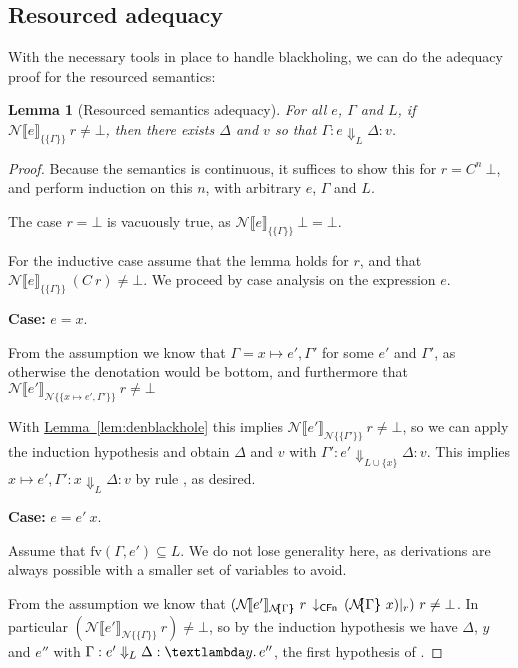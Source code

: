 \documentclass{jfp1}
\newcommand{\myref}[2]{\hyperref[#2]{#1~\ref*{#2}}}
\newtheorem{lemma}{Lemma}
\theoremstyle{nonumberbreak}
\newtheorem{proof}{Proof}
\newcommand{\sCFnProj}[2]{#1\,\downarrow_{\text{\textsf{CFn}}}\,#2}
\newcommand{\sLam}[2]{\text{\textlambda} #1.\, #2}
\newcommand{\sred}[5]{#1 : #2 \Downarrow_{#3} #4 : #5}
\newcommand{\sRule}[1]{\text{{\textsc{#1}}}}
\newcommand{\fv}[1]{\text{fv}(#1)}
\newcommand{\esem}[1]{\{\!\!\!\{#1\}\!\!\!\}}
\newcommand{\dsemr}[2]{\mathcal N\!\llbracket #1 \rrbracket_{#2}}
\newcommand{\esemr}[1]{\mathcal N\!\!\{\!\!\!\{#1\}\!\!\!\}}
\newcommand{\Crestr}[2]{ #1 |_{#2}}
\newcommand{\case}[1]{\par\smallskip\noindent\textbf{Case:} #1\nopagebreak\par\noindent\ignorespaces}
\begin{document}
\subsection{Resourced adequacy}

With the necessary tools in place to handle blackholing, we can do the adequacy proof for the resourced semantics:

\begin{lemma}[Resourced semantics adequacy]
For all $e$, $\Gamma$ and $L$,  if $\dsemr{e}{\esem{\Gamma}}~r \ne \bot$, then there exists $\Delta$ and $v$ so that $\sred \Gamma e L \Delta v$.
\label{lem:resad}
\end{lemma}

\begin{proof}
Because the semantics is continuous, it suffices to show this for $r = C^n~\bot$, and perform induction on this $n$, with arbitrary $e$, $\Gamma$ and $L$.

The case $r=\bot$ is vacuously true, as $\dsemr{e}{\esem{\Gamma}}~\bot = \bot$.

For the inductive case assume that the lemma holds for $r$, and that $\dsemr{e}{\esem{\Gamma}}~(C~r) \ne \bot$. We proceed by case analysis on the expression $e$.

\case{$e = x$.}
From the assumption we know that $\Gamma = x\mapsto e',\Gamma'$ for some $e'$ and $\Gamma'$, as otherwise the denotation would be bottom, and furthermore that $\dsemr{e'}{\esemr{x\mapsto e',\Gamma'}}~r \ne\bot$

With \myref{Lemma}{lem:denblackhole} this implies $\dsemr{e'}{\esemr{\Gamma'}}~r \ne\bot$, so we can apply the induction hypothesis and obtain $\Delta$ and $v$ with $\sred {\Gamma'} {e'} {L\cup\{x\}} \Delta v$. This implies $\sred {x\mapsto e',\Gamma'} {x} {L} \Delta v$ by rule \sRule{Var}, as desired.

\case{$e = e'~x$.}
Assume that $\fv{\Gamma, e'} \subseteq L$. We do not lose generality here, as derivations are always possible with a smaller set of variables to avoid.

From the assumption we know that
$\sCFnProj {(\dsemr {e'} {\esemr{\Gamma}}~r}{\Crestr{({\esemr{\Gamma}}~x)}{r}})~r \ne \bot$. In particular $(\dsemr {e'} {\esemr{\Gamma}}~r)\ne \bot$, so by the induction hypothesis we have $\Delta$, $y$ and $e''$ with $\sred{\Gamma}{e'}L\Delta {\sLam y {e''}}$, the first hypothesis of \sRule{App}.


\end{proof}
\end{document}
